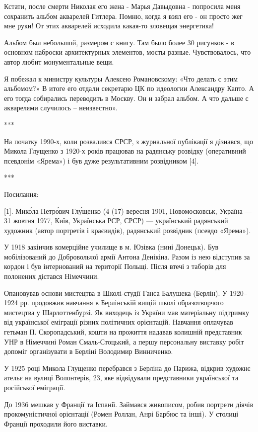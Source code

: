 Кстати, после смерти Николая его жена - Марья Давыдовна - попросила меня
сохранить альбом акварелей Гитлера. Помню, когда я взял его - он просто жег мне
руки! От этих акварелей исходила какая-то зловещая энергетика!

Альбом был небольшой, размером с книгу. Там было более 30 рисунков - в основном
наброски архитектурных элементов, мосты разные. Чувствовалось, что автор любит
монументальные вещи.

Я побежал к министру культуры Алексею Романовскому: «Что делать с этим
альбомом?» В итоге его отдали секретарю ЦК по идеологии Александру Капто. А его
тогда собирались переводить в Москву. Он и забрал альбом. А что дальше с
акварелями случилось – неизвестно».

***

На початку 1990-х, коли розвалився СРСР, з журнальної публікації я дізнався, що
Микола Глущенко з 1920-х років працював на радянську розвідку (оперативний
псевдонім «Ярема») і був дуже результативним розвідником [4]. 

***

Посилання:

[1]. Мико́ла Петро́вич Глу́щенко (4 (17) вересня 1901, Новомосковськ, Україна — 31
жовтня 1977, Київ, Українська РСР, СРСР) — український радянський художник
(автор портретів і краєвидів), радянський розвідник (псевдо «Ярема»). 

У 1918 закінчив комерційне училище в м. Юзівка (нині Донецьк). Був
мобілізований до Добровольчої армії Антона Денікіна. Разом із нею відступив за
кордон і був інтернований на території Польщі. Після втечі з таборів для
полонених дістався Німеччини.

Опановував основи мистецтва в Школі-студії Ганса Балушека (Берлін). У 1920–1924
рр. продовжив навчання в Берлінській вищій школі образотворчого мистецтва у
Шарлоттенбурзі. Як виходець із України мав матеріальну підтримку від
української еміграції різних політичних орієнтацій. Навчання оплачував гетьман
П. Скоропадський, кошти на прожиття надавав колишній представник УНР в
Німеччині Роман Смаль-Стоцький, а першу персональну виставку робіт допоміг
організувати в Берліні Володимир Винниченко.

У 1925 році Микола Глущенко перебрався з Берліна до Парижа, відкрив художнє
ательє на вулиці Волонтерів, 23, яке відвідували представники української та
російської еміграції.

До 1936 мешкав у Франції та Іспанії. Займався живописом, робив портрети діячів
прокомуністичної орієнтації (Ромен Роллан, Анрі Барбюс та інші). У столиці
Франції проходили його виставки. 

